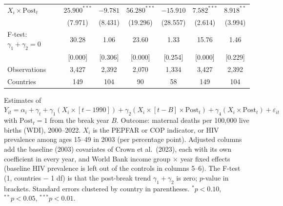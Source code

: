 \begin{table}[htbp]
{\begin{tabular}{lcccccc}
$X_i \times \mathrm{Post}_t$ \quad [$\gamma_4$] & $25.900^{***}$ & $-9.781$ & $56.280^{***}$ & $-15.910$ & $7.582^{***}$ & $8.918^{**}$ \\
 & (7.971) & (8.431) & (19.296) & (28.557) & (2.614) & (3.994) \\
F-test: $\gamma_1 + \gamma_2 = 0$ & 30.28 & 1.06 & 23.60 & 1.33 & 15.76 & 1.46 \\
 & [0.000] & [0.306] & [0.000] & [0.254] & [0.000] & [0.229] \\
Observations & 3,427 & 2,392 & 2,070 & 1,334 & 3,427 & 2,392 \\
Countries & 149 & 104 & 90 & 58 & 149 & 104 \\
\bottomrule
\end{tabular}}
\par\vspace{4pt}
\begin{minipage}{\textwidth}\footnotesize Estimates of $Y_{it} = \alpha_i + \gamma_t + \gamma_1 (X_i \times [t-1990]) + \gamma_2 (X_i \times [t-B] \times \mathrm{Post}_t) + \gamma_4 (X_i \times \mathrm{Post}_t) + \varepsilon_{it}$ with $\mathrm{Post}_t = 1$ from the break year $B$. Outcome: maternal deaths per 100,000 live births (WDI), 2000--2022. $X_i$ is the PEPFAR or COP indicator, or HIV prevalence among ages 15--49 in 2003 (per percentage point). Adjusted columns add the baseline (2003) covariates of Crown et al.\ (2023), each with its own coefficient in every year, and World Bank income group $\times$ year fixed effects (baseline HIV prevalence is left out of the controls in columns 5--6). The F-test (1, countries $-$ 1 df) is that the post-break trend $\gamma_1 + \gamma_2$ is zero; $p$-value in brackets. Standard errors clustered by country in parentheses. $^{*}p<0.10$, $^{**}p<0.05$, $^{***}p<0.01$.\end{minipage}
\end{table}
